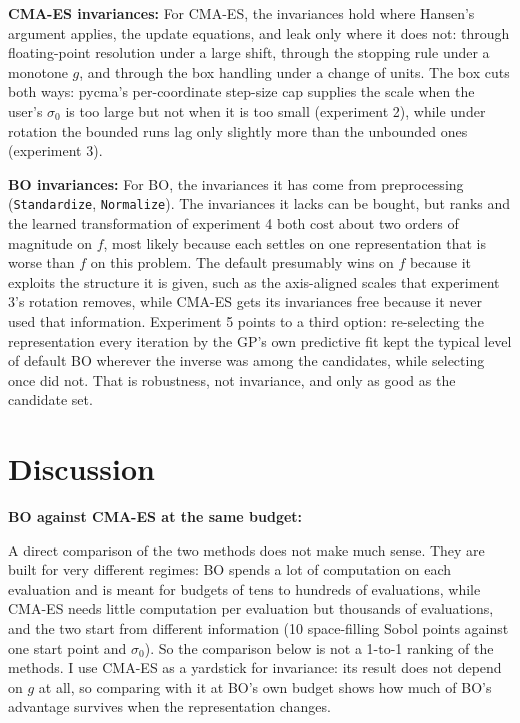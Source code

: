 \documentclass[12pt,a4paper]{article}
\begin{document}
\textbf{CMA-ES invariances:} For CMA-ES, the invariances hold where Hansen's argument applies, the update equations, and leak only where it does not: through floating-point resolution under a large shift, through the stopping rule under a monotone \(g\), and through the box handling under a change of units. The box cuts both ways: pycma's per-coordinate step-size cap supplies the scale when the user's \(\sigma_{0}\) is too large but not when it is too small (experiment 2), while under rotation the bounded runs lag only slightly more than the unbounded ones (experiment 3).

\textbf{BO invariances:} For BO, the invariances it has come from preprocessing (\texttt{Standardize}, \texttt{Normalize}). The invariances it lacks can be bought, but ranks and the learned transformation of experiment 4 both cost about two orders of magnitude on \(f\), most likely because each settles on one representation that is worse than \(f\) on this problem. The default presumably wins on \(f\) because it exploits the structure it is given, such as the axis-aligned scales that experiment 3's rotation removes, while CMA-ES gets its invariances free because it never used that information. Experiment 5 points to a third option: re-selecting the representation every iteration by the GP's own predictive fit kept the typical level of default BO wherever the inverse was among the candidates, while selecting once did not. That is robustness, not invariance, and only as good as the candidate set.

\section{Discussion}

\textbf{BO against CMA-ES at the same budget:}

A direct comparison of the two methods does not make much sense. They are built for very different regimes: BO spends a lot of computation on each evaluation and is meant for budgets of tens to hundreds of evaluations, while CMA-ES needs little computation per evaluation but thousands of evaluations, and the two start from different information (10 space-filling Sobol points against one start point and \(\sigma_{0}\)). So the comparison below is not a 1-to-1 ranking of the methods. I use CMA-ES as a yardstick for invariance: its result does not depend on \(g\) at all, so comparing with it at BO's own budget shows how much of BO's advantage survives when the representation changes.
\end{document}
